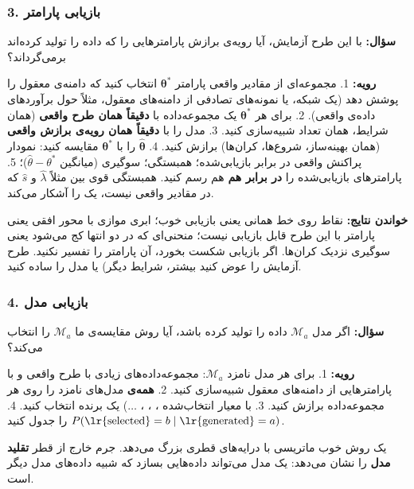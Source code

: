 \subsubsection{3. بازیابی پارامتر}

\textbf{سؤال:} با این طرح آزمایش، آیا رویه‌ی برازش پارامترهایی را که داده
را تولید کرده‌اند برمی‌گرداند؟

\textbf{رویه:} 1. مجموعه‌ای از مقادیر واقعی پارامتر
\(\boldsymbol\theta^\ast\) انتخاب کنید که دامنه‌ی معقول را پوشش دهد (یک
شبکه، یا نمونه‌های تصادفی از دامنه‌های معقول، مثلاً حول برآوردهای داده‌ی
واقعی). 2. برای هر \(\boldsymbol\theta^\ast\) یک مجموعه‌داده با
\textbf{دقیقاً همان طرح واقعی} (همان شرایط، همان تعداد 
شبیه‌سازی کنید. 3. مدل را با \textbf{دقیقاً همان رویه‌ی برازش واقعی} (همان
بهینه‌ساز، شروع‌ها، کران‌ها) برازش کنید. 4. \(\hat{\boldsymbol\theta}\) را
با \(\boldsymbol\theta^\ast\) مقایسه کنید: نمودار پراکنش واقعی در برابر
بازیابی‌شده؛ همبستگی؛ سوگیری (میانگین \(\hat\theta - \theta^\ast\))؛
 5. پارامترهای بازیابی‌شده را \textbf{در برابر هم} هم رسم کنید.
همبستگی قوی بین مثلاً \(\hat\lambda\) و \(\hat s\) که در مقادیر واقعی
نیست، یک \textbf{} را آشکار می‌کند.

\textbf{خواندن نتایج:} نقاط روی خط همانی یعنی بازیابی خوب؛ ابری موازی با
محور افقی یعنی پارامتر با این طرح قابل بازیابی نیست؛ منحنی‌ای که در دو
انتها کج می‌شود یعنی سوگیری نزدیک کران‌ها. اگر بازیابی شکست بخورد، آن
پارامتر را تفسیر نکنید. طرح آزمایش را عوض کنید  بیشتر، شرایط
دیگر) یا مدل را ساده کنید.

\subsubsection{4. بازیابی مدل}

\textbf{سؤال:} اگر مدل \(\mathcal{M}_a\) داده را تولید کرده باشد، آیا
روش مقایسه‌ی ما \(\mathcal{M}_a\) را انتخاب می‌کند؟

\textbf{رویه:} 1. برای هر مدل نامزد \(\mathcal{M}_a\): مجموعه‌داده‌های
زیادی با طرح واقعی و با پارامترهایی از دامنه‌های معقول شبیه‌سازی کنید. 2.
\textbf{همه‌ی} مدل‌های نامزد را روی هر مجموعه‌داده برازش کنید. 3. با معیار
انتخاب‌شده ، ، ، \ensuremath{\ldots}) یک برنده انتخاب کنید. 4.
\textbf{}
\(P(\text{\lr{selected}} = b \mid \text{\lr{generated}} = a)\) را جدول کنید.

یک روش خوب ماتریسی با درایه‌های قطری بزرگ می‌دهد. جرم خارج از قطر
\textbf{تقلید مدل}  را نشان می‌دهد: یک مدل می‌تواند
داده‌هایی بسازد که شبیه داده‌های مدل دیگر است.

